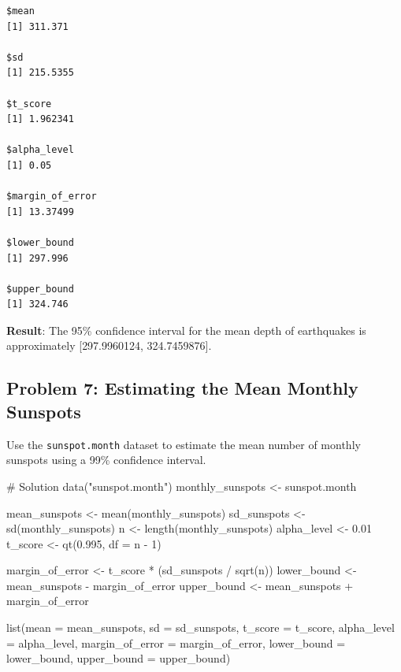 \documentclass[
  letterpaper,
  DIV=11,
  numbers=noendperiod]{scrreprt}
\newenvironment{Shaded}{\begin{snugshade}}{\end{snugshade}}
\newcommand{\AttributeTok}[1]{\textcolor[rgb]{0.40,0.45,0.13}{#1}}
\newcommand{\CommentTok}[1]{\textcolor[rgb]{0.37,0.37,0.37}{#1}}
\newcommand{\DecValTok}[1]{\textcolor[rgb]{0.68,0.00,0.00}{#1}}
\newcommand{\FloatTok}[1]{\textcolor[rgb]{0.68,0.00,0.00}{#1}}
\newcommand{\FunctionTok}[1]{\textcolor[rgb]{0.28,0.35,0.67}{#1}}
\newcommand{\NormalTok}[1]{\textcolor[rgb]{0.00,0.23,0.31}{#1}}
\newcommand{\OtherTok}[1]{\textcolor[rgb]{0.00,0.23,0.31}{#1}}
\newcommand{\SpecialCharTok}[1]{\textcolor[rgb]{0.37,0.37,0.37}{#1}}
\newcommand{\StringTok}[1]{\textcolor[rgb]{0.13,0.47,0.30}{#1}}
\begin{document}
\begin{verbatim}
$mean
[1] 311.371

$sd
[1] 215.5355

$t_score
[1] 1.962341

$alpha_level
[1] 0.05

$margin_of_error
[1] 13.37499

$lower_bound
[1] 297.996

$upper_bound
[1] 324.746
\end{verbatim}

\textbf{Result}: The 95\% confidence interval for the mean depth of
earthquakes is approximately {[}297.9960124, 324.7459876{]}.

\subsection*{Problem 7: Estimating the Mean Monthly
Sunspots}\label{problem-7-estimating-the-mean-monthly-sunspots}

Use the \texttt{sunspot.month} dataset to estimate the mean number of
monthly sunspots using a 99\% confidence interval.

\begin{Shaded}
\begin{Highlighting}[]
\CommentTok{\# Solution}
\FunctionTok{data}\NormalTok{(}\StringTok{"sunspot.month"}\NormalTok{)}
\NormalTok{monthly\_sunspots }\OtherTok{\textless{}{-}}\NormalTok{ sunspot.month}

\NormalTok{mean\_sunspots }\OtherTok{\textless{}{-}} \FunctionTok{mean}\NormalTok{(monthly\_sunspots)}
\NormalTok{sd\_sunspots }\OtherTok{\textless{}{-}} \FunctionTok{sd}\NormalTok{(monthly\_sunspots)}
\NormalTok{n }\OtherTok{\textless{}{-}} \FunctionTok{length}\NormalTok{(monthly\_sunspots)}
\NormalTok{alpha\_level }\OtherTok{\textless{}{-}} \FloatTok{0.01}
\NormalTok{t\_score }\OtherTok{\textless{}{-}} \FunctionTok{qt}\NormalTok{(}\FloatTok{0.995}\NormalTok{, }\AttributeTok{df =}\NormalTok{ n }\SpecialCharTok{{-}} \DecValTok{1}\NormalTok{)}

\NormalTok{margin\_of\_error }\OtherTok{\textless{}{-}}\NormalTok{ t\_score }\SpecialCharTok{*}\NormalTok{ (sd\_sunspots }\SpecialCharTok{/} \FunctionTok{sqrt}\NormalTok{(n))}
\NormalTok{lower\_bound }\OtherTok{\textless{}{-}}\NormalTok{ mean\_sunspots }\SpecialCharTok{{-}}\NormalTok{ margin\_of\_error}
\NormalTok{upper\_bound }\OtherTok{\textless{}{-}}\NormalTok{ mean\_sunspots }\SpecialCharTok{+}\NormalTok{ margin\_of\_error}

\FunctionTok{list}\NormalTok{(}\AttributeTok{mean =}\NormalTok{ mean\_sunspots, }\AttributeTok{sd =}\NormalTok{ sd\_sunspots, }\AttributeTok{t\_score =}\NormalTok{ t\_score, }\AttributeTok{alpha\_level =}\NormalTok{ alpha\_level,}
     \AttributeTok{margin\_of\_error =}\NormalTok{ margin\_of\_error, }\AttributeTok{lower\_bound =}\NormalTok{ lower\_bound, }\AttributeTok{upper\_bound =}\NormalTok{ upper\_bound)}
\end{Highlighting}
\end{Shaded}
\end{document}

